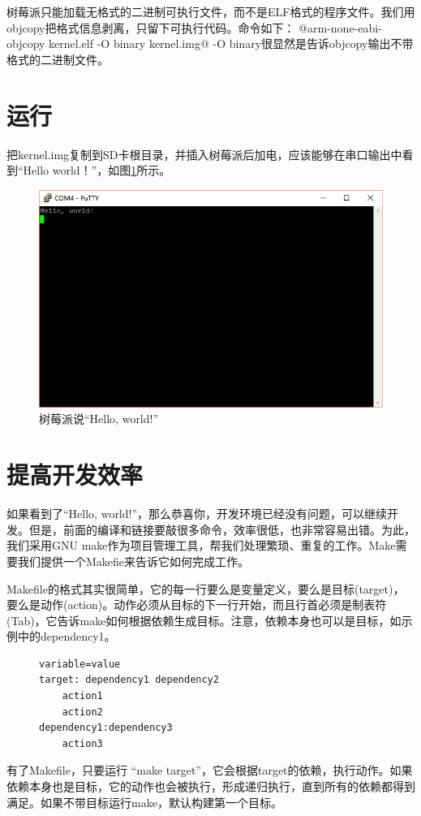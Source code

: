 \documentclass[main.tex]{subfiles}
\begin{document}
\begin{CJK*}{UTF8}{song}
树莓派只能加载无格式的二进制可执行文件，而不是ELF格式的程序文件。我们用objcopy把格式信息剥离，只留下可执行代码。命令如下：
@arm-none-eabi-objcopy kernel.elf -O binary kernel.img@
\noindent
-O binary很显然是告诉objcopy输出不带格式的二进制文件。
\section{运行}
把kernel.img复制到SD卡根目录，并插入树莓派后加电，应该能够在串口输出中看到“Hello world！”，如图\ref{figure:2-2}所示。

\begin{figure}[htp]
\centering
\includegraphics[scale=0.4]{figures/2-2.png}
\caption{树莓派说“Hello, world!”}
\label{figure:2-2}
\end{figure}

\section{提高开发效率}
\justify
如果看到了“Hello, world!”，那么恭喜你，开发环境已经没有问题，可以继续开发。但是，前面的编译和链接要敲很多命令，效率很低，也非常容易出错。为此，我们采用GNU make作为项目管理工具，帮我们处理繁琐、重复的工作。Make需要我们提供一个Makefie来告诉它如何完成工作。

\par
Makefile的格式其实很简单，它的每一行要么是变量定义，要么是目标(target)，要么是动作(action)。动作必须从目标的下一行开始，而且行首必须是制表符(Tab)，它告诉make如何根据依赖生成目标。注意，依赖本身也可以是目标，如示例中的dependency1。
\begin{figure}[htp]
\centering
\begin{minipage}{0.4\textwidth}
\begin{verbatim}
variable=value
target: dependency1 dependency2
    action1
    action2
dependency1:dependency3
    action3
\end{verbatim}
\end{minipage}
\end{figure}
\par
有了Makefile，只要运行 “make target”，它会根据target的依赖，执行动作。如果依赖本身也是目标，它的动作也会被执行，形成递归执行，直到所有的依赖都得到满足。如果不带目标运行make，默认构建第一个目标。


\end{CJK*}
\end{document}
